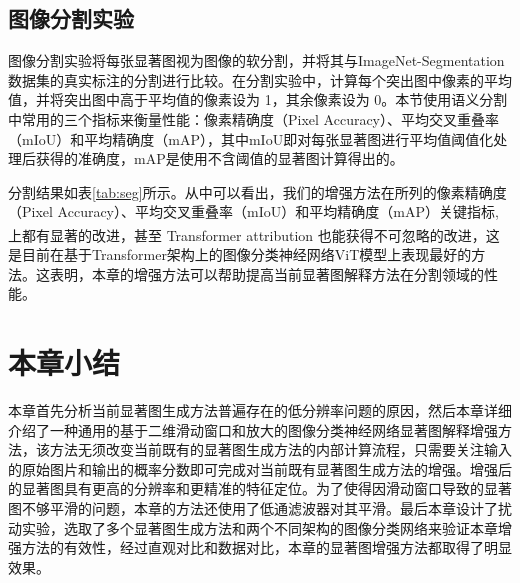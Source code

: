 \subsection{图像分割实验}
图像分割实验将每张显著图视为图像的软分割，并将其与ImageNet-Segmentation数据集的真实标注的分割进行比较。在分割实验中，计算每个突出图中像素的平均值，并将突出图中高于平均值的像素设为 1，其余像素设为 0。本节使用语义分割中常用的三个指标来衡量性能：像素精确度（Pixel Accuracy）、平均交叉重叠率（mIoU）和平均精确度（mAP），其中mIoU即对每张显著图进行平均值阈值化处理后获得的准确度，mAP是使用不含阈值的显著图计算得出的。

分割结果如表\ref{tab:seg}所示。从中可以看出，我们的增强方法在所列的像素精确度（Pixel Accuracy）、平均交叉重叠率（mIoU）和平均精确度（mAP）关键指标,上都有显著的改进，甚至 Transformer attribution\textsuperscript{\cite{chefer2021transformer}} 也能获得不可忽略的改进，这是目前在基于Transformer架构上的图像分类神经网络ViT模型上表现最好的方法。这表明，本章的增强方法可以帮助提高当前显著图解释方法在分割领域的性能。

	
\section{本章小结}
本章首先分析当前显著图生成方法普遍存在的低分辨率问题的原因，然后本章详细介绍了一种通用的基于二维滑动窗口和放大的图像分类神经网络显著图解释增强方法，该方法无须改变当前既有的显著图生成方法的内部计算流程，只需要关注输入的原始图片和输出的概率分数即可完成对当前既有显著图生成方法的增强。增强后的显著图具有更高的分辨率和更精准的特征定位。为了使得因滑动窗口导致的显著图不够平滑的问题，本章的方法还使用了低通滤波器对其平滑。最后本章设计了扰动实验，选取了多个显著图生成方法和两个不同架构的图像分类网络来验证本章增强方法的有效性，经过直观对比和数据对比，本章的显著图增强方法都取得了明显效果。 

